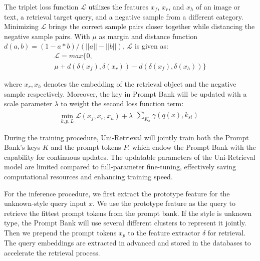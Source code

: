 \noindent The triplet loss function $\mathcal{L}$ utilizes the features $x_f$, $x_r$, and $x_h$ of an image or text, a retrieval target query, and a negative sample from a different category. 
Minimizing $\mathcal{L}$ brings the correct sample pairs closer together while distancing the negative sample pairs.
With $\mu$ as margin and distance function $d(a,b)=(1-a*b)/(||a||-||b||)$, $\mathcal L$ is given as: 
{\setlength{\abovedisplayskip}{6pt}
\setlength{\belowdisplayskip}{6pt}
\begin{multline}
\mathcal L = max\{0, \\
\mu + d(\delta(x_f), \delta(x_r))-d(\delta(x_f), \delta(x_h))\}
\end{multline}}

\noindent where $x_r, x_h$ denotes the embedding of the retrieval object and the negative sample respectively. Moreover, the key in Prompt Bank will be updated with a scale parameter $\lambda$ to weight the second loss function term:
{\setlength{\abovedisplayskip}{6pt}
\setlength{\belowdisplayskip}{6pt}
\begin{eqnarray}
\min_{k,p,L} \mathcal L(x_f, x_r, x_h) + \lambda \begin{matrix}\sum_{K_x}\gamma(q(x), k_{si})\end{matrix}
\end{eqnarray}}

During the training procedure, Uni-Retrieval will jointly train both the Prompt Bank's keys $K$ and the prompt tokens $P$, which endow the Prompt Bank with the capability for continuous updates. The updatable parameters of the Uni-Retrieval model are limited compared to full-parameter fine-tuning, effectively saving computational resources and enhancing training speed. 

For the inference procedure, we first extract the prototype feature for the unknown-style query input $x$. We use the prototype feature as the query to retrieve the fittest prompt tokens from the prompt bank. If the style is unknown type, the Prompt Bank will use several different clusters to represent it jointly. Then we prepend the prompt tokens $x_p$ to the feature extractor $\delta$ for retrieval. The query embeddings are extracted in advanced and stored in the databases to accelerate the retrieval process.

